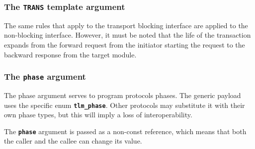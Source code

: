 {\subsubsection{The \texttt{TRANS} template argument}
The same rules that apply to the transport blocking interface are applied to the non-blocking interface.
However, it must be noted that the life of the transaction expands from the forward request from the initiator starting the request to the backward response from the target module.

\subsubsection{The \texttt{phase} argument}
The phase argument serves to program protocols phases.
The generic payload uses the specific enum \texttt{\textbf{tlm\_phase}}.
Other protocols may substitute it with their own phase types, but this will imply a loss of interoperability.

The \texttt{\textbf{phase}} argument is passed as a non-const reference, which means that both the caller and the callee can change its value.

}

